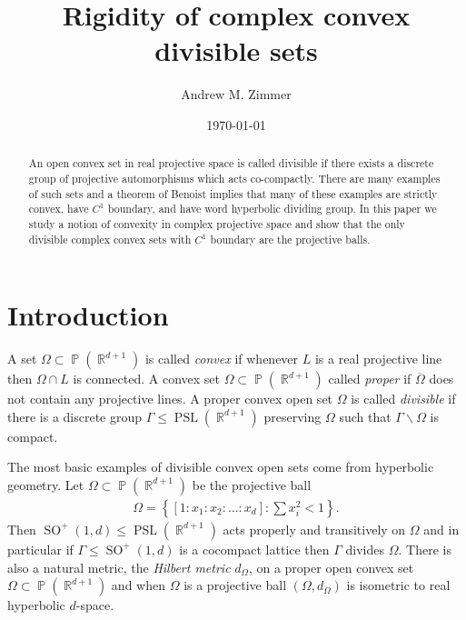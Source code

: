 \documentclass[12pt]{amsart}
\theoremstyle{plain}
\theoremstyle{definition}
\theoremstyle{remark}
\begin{document}
\title{Rigidity of complex convex divisible sets}
\author{Andrew M. Zimmer}\address{Department of Mathematics, University of Michigan, Ann Arbor, MI 48109.}
\date{\today}
\keywords{}

\begin{abstract} An open convex set in real projective space is called divisible if there exists a discrete group of projective automorphisms which acts co-compactly. There are many examples of such sets and a theorem of Benoist implies that many of these examples are strictly convex, have $C^1$ boundary, and have word hyperbolic dividing group. In this paper we study a notion of convexity in complex projective space and show that the only divisible complex convex sets with $C^1$ boundary are the projective balls. 
\end{abstract}

\maketitle

\section{Introduction}

A set $\Omega \subset \operatorname{\mathbb{P}}(\operatorname{\mathbb{R}}^{d+1})$ is called \emph{convex} if whenever $L$ is a real projective line then  $\Omega \cap L$ is connected. A convex set $\Omega \subset \operatorname{\mathbb{P}}(\operatorname{\mathbb{R}}^{d+1})$ called \emph{proper} if $\overline{\Omega}$ does not contain any projective lines. A proper convex open set $\Omega$ is called \emph{divisible} if there is a discrete group $\Gamma \leq \operatorname{PSL}(\operatorname{\mathbb{R}}^{d+1})$ preserving $\Omega$ such that $\Gamma \backslash \Omega$ is compact. 

The most basic examples of divisible convex open sets come from hyperbolic geometry. Let $\Omega \subset \operatorname{\mathbb{P}}(\operatorname{\mathbb{R}}^{d+1})$ be the projective ball
\begin{align*}
\Omega = \left\{ [1 : x_1 : x_2 : \dots : x_d ] : \sum x_i^2  < 1\right\}.
\end{align*}
Then $\operatorname{SO}^+(1,d) \leq \operatorname{PSL}(\operatorname{\mathbb{R}}^{d+1})$ acts properly and transitively on $\Omega$ and in particular if $\Gamma \leq \operatorname{SO}^+(1,d)$ is a cocompact lattice then $\Gamma$ divides $\Omega$. There is also a natural metric, the \emph{Hilbert metric} $d_{\Omega}$, on a proper open convex set $\Omega \subset \operatorname{\mathbb{P}}(\operatorname{\mathbb{R}}^{d+1})$ and when $\Omega$ is a projective ball $(\Omega, d_{\Omega})$ is isometric to real hyperbolic $d$-space. 
\end{document}

